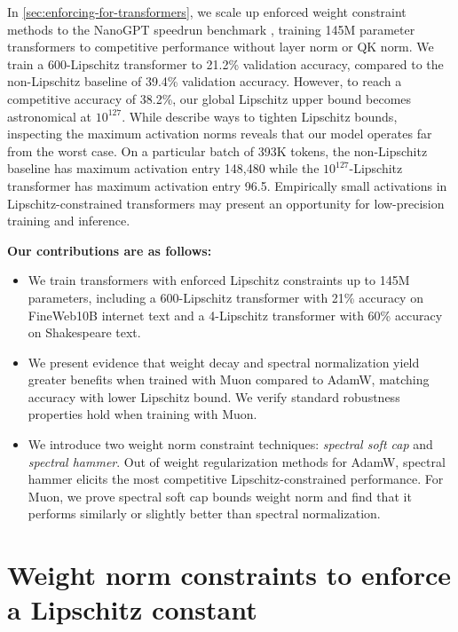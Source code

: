 In \cref{sec:enforcing-for-transformers}, we scale up enforced weight constraint methods to the NanoGPT speedrun benchmark \citep{modded_nanogpt_2024}, training 145M parameter transformers to competitive performance without layer norm or QK norm. We train a $600$-Lipschitz transformer to 21.2\% validation accuracy, compared to the non-Lipschitz baseline of 39.4\% validation accuracy. However, to reach a competitive accuracy of 38.2\%, our global Lipschitz upper bound becomes astronomical at $10^{127}$. While \citet{fazlyab2023efficientaccurateestimationlipschitz} describe ways to tighten Lipschitz bounds, inspecting the maximum activation norms reveals that our model operates far from the worst case. On a particular batch of 393K tokens, the non-Lipschitz baseline has maximum activation entry 148,480 while the $10^{127}$-Lipschitz transformer has maximum activation entry 96.5. Empirically small activations in Lipschitz-constrained transformers may present an opportunity for low-precision training and inference.

\vspace{1em}

\textbf{Our contributions are as follows:}
\begin{itemize}
    \item We train transformers with enforced Lipschitz constraints up to 145M parameters, including a 600-Lipschitz transformer with 21\% accuracy on FineWeb10B internet text and a 4-Lipschitz transformer with 60\% accuracy on Shakespeare text.
    \item We present evidence that weight decay and spectral normalization yield greater benefits when trained with Muon compared to AdamW, matching accuracy with lower Lipschitz bound. We verify standard robustness properties hold when training with Muon.
    \item We introduce two weight norm constraint techniques: \textit{spectral soft cap} and \textit{spectral hammer}. Out of weight regularization methods for AdamW, spectral hammer elicits the most competitive Lipschitz-constrained performance. For Muon, we prove spectral soft cap bounds weight norm and find that it performs similarly or slightly better than spectral normalization. 
\end{itemize}


\section{Weight norm constraints to enforce a Lipschitz constant}
\label{sec:comparing-methods}

